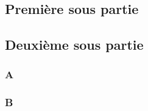 \subsection{Première sous partie}

\lipsum[1-2]

\subsection{Deuxième sous partie}

\subsubsection{A}

    \lipsum[1-2]

\subsubsection{B}

    \lipsum[1-2]